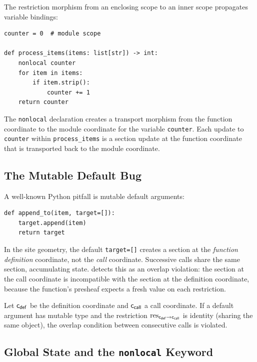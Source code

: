 \documentclass[11pt]{article}
\begin{document}
The restriction morphism from an enclosing scope to an inner scope
propagates variable bindings:

\begin{lstlisting}[style=jugeo-python,caption={Mutable state with nested scopes.}]
counter = 0  # module scope

def process_items(items: list[str]) -> int:
    nonlocal counter
    for item in items:
        if item.strip():
            counter += 1
    return counter
\end{lstlisting}

The \texttt{nonlocal} declaration creates a transport morphism from
the function coordinate to the module coordinate for the variable
\texttt{counter}.  Each update to \texttt{counter} within
\texttt{process\_items} is a section update at the function coordinate
that is transported back to the module coordinate.

\subsection{The Mutable Default Bug}

A well-known Python pitfall is mutable default arguments:

\begin{lstlisting}[style=jugeo-python,caption={Mutable default argument.}]
def append_to(item, target=[]):
    target.append(item)
    return target
\end{lstlisting}

In the site geometry, the default \texttt{target=[]} creates a section
at the \emph{function definition} coordinate, not the \emph{call}
coordinate.  Successive calls share the same section, accumulating
state.  \JuGeo{} detects this as an overlap violation: the section at
the call coordinate is incompatible with the section at the definition
coordinate, because the function's presheaf expects a fresh value on
each restriction.

\begin{proposition}\label{prop:mut-default}
Let $\mathsf{c}_{\mathsf{def}}$ be the definition coordinate and
$\mathsf{c}_{\mathsf{call}}$ a call coordinate.  If a default argument
has mutable type and the restriction
$\mathrm{res}_{\mathsf{c}_{\mathsf{def}} \to \mathsf{c}_{\mathsf{call}}}$ is
identity (sharing the same object), the overlap condition between
consecutive calls is violated.
\end{proposition}

\subsection{Global State and the \texttt{nonlocal} Keyword}
\end{document}
